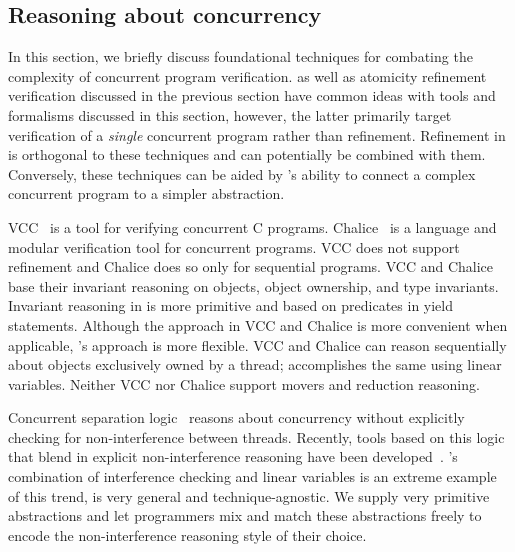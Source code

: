 \subsection{Reasoning about concurrency}
In this section, we briefly discuss foundational techniques
for combating the complexity of concurrent program verification. 
\civl as well as atomicity refinement verification discussed in the previous
section have common ideas with tools and formalisms
discussed in this section, however, the latter primarily target verification of a {\em single} concurrent program rather than refinement. 
Refinement in \civl is orthogonal to these techniques and can potentially be combined with them.
Conversely, these techniques can be aided by \civl's 
ability to connect a complex concurrent program to a simpler abstraction.

VCC~\cite{VCC} is a tool for verifying concurrent C programs.  
Chalice~\cite{LM09} is a language and modular verification tool for concurrent programs. 
VCC does not support refinement and Chalice does so only for sequential programs.  
VCC and Chalice base their invariant reasoning on objects, object ownership, and type invariants. 
Invariant reasoning in \civl is more primitive and based on predicates in yield statements. 
Although the approach in VCC and Chalice is more convenient when applicable, \civl's approach is more flexible. 
VCC and Chalice can reason sequentially about objects exclusively owned by a thread;
\civl accomplishes the same using linear variables.
Neither VCC nor Chalice support movers and reduction reasoning.

Concurrent separation logic~\cite{OHearn07} reasons about concurrency without 
explicitly checking for non-interference between threads. 
Recently, tools based on this logic that blend in explicit non-interference reasoning have been developed~\cite{SAGL,RGSep}. 
\civl's combination of interference checking and linear variables is
an extreme example of this trend, is very general and technique-agnostic. 
We supply very primitive abstractions and let programmers mix and
match these abstractions freely to encode the non-interference reasoning style of their choice. 



